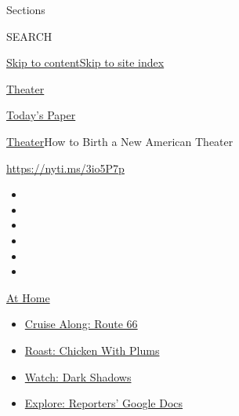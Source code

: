 Sections

SEARCH

\protect\hyperlink{site-content}{Skip to
content}\protect\hyperlink{site-index}{Skip to site index}

\href{https://www.nytimes3xbfgragh.onion/section/theater}{Theater}

\href{https://myaccount.nytimes3xbfgragh.onion/auth/login?response_type=cookie\&client_id=vi}{}

\href{https://www.nytimes3xbfgragh.onion/section/todayspaper}{Today's
Paper}

\href{/section/theater}{Theater}\textbar{}How to Birth a New American
Theater

\url{https://nyti.ms/3io5P7p}

\begin{itemize}
\item
\item
\item
\item
\item
\item
\end{itemize}

\href{https://www.nytimes3xbfgragh.onion/spotlight/at-home?action=click\&pgtype=Article\&state=default\&region=TOP_BANNER\&context=at_home_menu}{At
Home}

\begin{itemize}
\tightlist
\item
  \href{https://www.nytimes3xbfgragh.onion/2020/09/07/travel/route-66.html?action=click\&pgtype=Article\&state=default\&region=TOP_BANNER\&context=at_home_menu}{Cruise
  Along: Route 66}
\item
  \href{https://www.nytimes3xbfgragh.onion/2020/09/04/dining/sheet-pan-chicken.html?action=click\&pgtype=Article\&state=default\&region=TOP_BANNER\&context=at_home_menu}{Roast:
  Chicken With Plums}
\item
  \href{https://www.nytimes3xbfgragh.onion/2020/09/04/arts/television/dark-shadows-stream.html?action=click\&pgtype=Article\&state=default\&region=TOP_BANNER\&context=at_home_menu}{Watch:
  Dark Shadows}
\item
  \href{https://www.nytimes3xbfgragh.onion/interactive/2020/at-home/even-more-reporters-editors-diaries-lists-recommendations.html?action=click\&pgtype=Article\&state=default\&region=TOP_BANNER\&context=at_home_menu}{Explore:
  Reporters' Google Docs}
\end{itemize}

